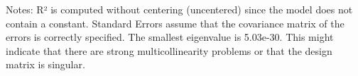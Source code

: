 \bigskip
Notes: \newline 
[1] R² is computed without centering (uncentered) since the                 model does not contain a constant. \newline 
[2] Standard Errors assume that the covariance matrix of the errors is correctly specified. \newline 
[3] The smallest eigenvalue is 5.03e-30. This might indicate that                there are strong multicollinearity problems or that the design                matrix is singular.
